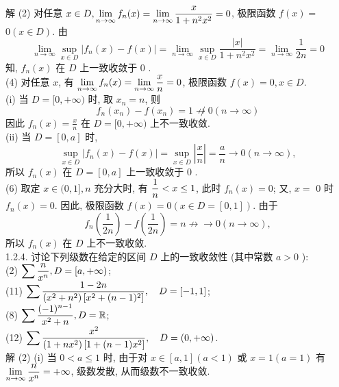 \documentclass[a4paper,11pt,UTF8]{article}
\begin{document}
解 (2) 对任意 $\displaystyle \displaystyle \displaystyle x \in D, \lim _{n \rightarrow \infty} f_n(x)=\lim _{n \rightarrow \infty} \frac{x}{1+n^2 x^2}=0$, 极限函数 $\displaystyle f(x)=$ $0(x \in D)$. 由
$$
\lim _{n \rightarrow \infty} \sup _{x \in D}\left|f_n(x)-f(x)\right|=\lim _{n \rightarrow \infty} \sup _{x \in D} \frac{|x|}{1+n^2 x^2}=\lim _{n \rightarrow \infty} \frac{1}{2 n}=0
$$
知, $\displaystyle f_n(x)$ 在 $D$ 上一致收敛于 0 .\\
(4) 对任意 $x$, 有 $\displaystyle \displaystyle \displaystyle \lim _{n \rightarrow \infty} f_n(x)=\lim _{n \rightarrow \infty} \frac{x}{n}=0$, 极限函数 $\displaystyle f(x)=0, x \in D$.\\
(i) 当 $D=[0,+\infty)$ 时, 取 $x_n=n$, 则
$$
f_n\left(x_n\right)-f\left(x_n\right)=1 \not \nrightarrow 0(n \rightarrow \infty)
$$
因此 $\displaystyle f_n(x)=\frac{x}{n}$ 在 $D=[0,+\infty)$ 上不一致收敛.\\
(ii) 当 $D=[0, a]$ 时,
$$
\sup _{x \in D}\left|f_n(x)-f(x)\right|=\sup _{x \in D}\left|\frac{x}{n}\right|=\frac{a}{n} \rightarrow 0(n \rightarrow \infty),
$$
所以 $\displaystyle f_n(x)$ 在 $D=[0, a]$ 上一致收敛于 0 .\\
(6) 取定 $x \in(0,1], n$ 充分大时, 有 $\displaystyle \displaystyle \displaystyle \frac{1}{n}<x \leq 1$, 此时 $\displaystyle f_n(x)=0$; 又, $x=$ 0 时 $\displaystyle f_n(x)=0$. 因此, 极限函数 $\displaystyle f(x)=0(x \in D=[0,1])$. 由于
$$
f_n\left(\frac{1}{2 n}\right)-f\left(\frac{1}{2 n}\right)=n \nrightarrow \rightarrow 0(n \rightarrow \infty),
$$
所以 $\displaystyle f_n(x)$ 在 $D$ 上不一致收敛.\\
1.2.4. 讨论下列级数在给定的区间 $D$ 上的一致收敛性 (其中常数 $a>0$ ):\\
(2) $\displaystyle \displaystyle \displaystyle \sum \frac{n}{x^n}, D=[a,+\infty)$;\\
(11) $\displaystyle \displaystyle \displaystyle \sum \frac{1-2 n}{\left(x^2+n^2\right)\left[x^2+(n-1)^2\right]}, \quad D=[-1,1]$;\\
(8) $\displaystyle \displaystyle \displaystyle \sum \frac{(-1)^{n-1}}{x^2+n}, D=\mathbb{R}$;\\
(12) $\displaystyle \displaystyle \displaystyle \sum \frac{x^2}{\left(1+n x^2\right)\left[1+(n-1) x^2\right]}, \quad D=(0,+\infty)$.\\
解 (2) (i) 当 $0<a \leq 1$ 时, 由于对 $x \in[a, 1](a<1)$ 或 $x=1(a=1)$ 有 $\displaystyle \displaystyle \displaystyle \lim _{n \rightarrow \infty} \frac{n}{x^n}=+\infty$, 级数发散, 从而级数不一致收敛.\\
\end{document}

